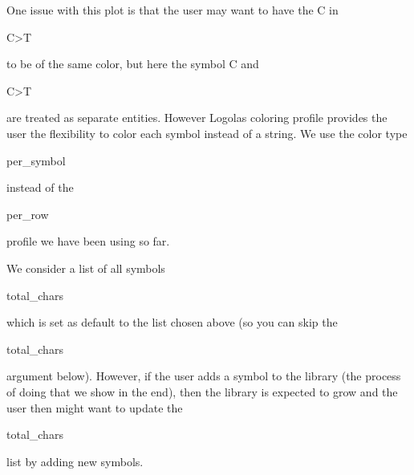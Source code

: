\documentclass[12pt]{article}\usepackage[]{graphicx}\usepackage[usenames,dvipsnames]{color}
\begin{document}
One issue with this plot is that the user may want to have the C in \begin{verb} C>T \end{verb}
to be of the same color, but here the symbol C and \begin{verb} C>T \end{verb} are treated
as separate entities. However Logolas coloring profile provides the user the flexibility to color each symbol instead of a string. We use the color type \begin{verb} per_symbol \end{verb} instead of the \begin{verb} per_row \end{verb} profile we have been using so far.

We consider a list of all symbols \begin{verb} total_chars \end{verb} which is set as default to the list chosen above (so you can skip the \begin{verb} total_chars \end{verb} argument below). However, if the user adds a symbol to the library (the process of doing that we show in the end), then the library
is expected to grow and the user then might want to update the \begin{verb} total_chars \end{verb} list by adding new symbols.
\end{document}

